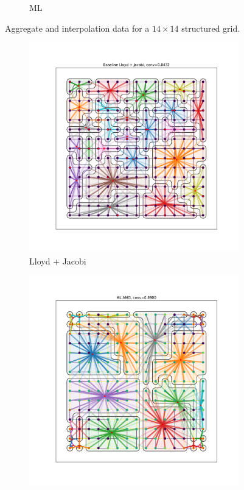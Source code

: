 \documentclass{article}
\begin{document}
\begin{figure}[h]
\begin{subfigure}[t]{0.49\textwidth}
    \caption{ML}
  \end{subfigure}
  \caption{Aggregate and interpolation data for a $14 \times 14$ structured grid.}
  \label{fig:grid14}
\end{figure}
\begin{figure}[h]
  \centering
  \begin{subfigure}[t]{0.49\textwidth}
    \centering
    \includegraphics[width=\textwidth]{grid_15_lloyd.pdf}
    \caption{Lloyd + Jacobi}
  \end{subfigure}
  \begin{subfigure}[t]{0.49\textwidth}
    \centering
    \includegraphics[width=\textwidth]{grid_15_ml.pdf}

\end{subfigure}
\end{figure}
\end{document}
